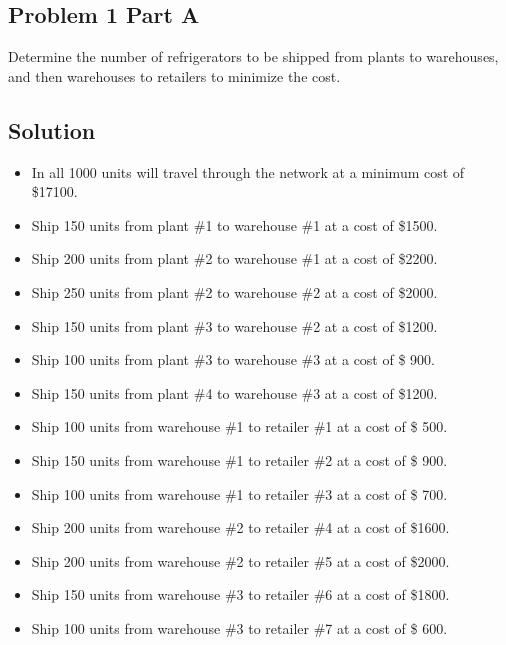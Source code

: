 \documentclass[../report/main.tex]{subfiles}
\begin{document}
\subsection*{Problem 1 Part A}
Determine the number of refrigerators to be shipped from plants to warehouses, and then warehouses to retailers to minimize the cost.

\subsection*{Solution}
\begin{itemize}
	\item In all 1000 units will travel through the network at a minimum cost of \$17100.
	\newline
	\item Ship 150 units from plant \#1 to warehouse \#1 at a cost of \$1500.
	\item Ship 200 units from plant \#2 to warehouse \#1 at a cost of \$2200.
	\item Ship 250 units from plant \#2 to warehouse \#2 at a cost of \$2000.
	\item Ship 150 units from plant \#3 to warehouse \#2 at a cost of \$1200.
	\item Ship 100 units from plant \#3 to warehouse \#3 at a cost of \$ 900.
	\item Ship 150 units from plant \#4 to warehouse \#3 at a cost of \$1200.
	\newline
	\item Ship 100 units from warehouse \#1 to retailer \#1 at a cost of \$ 500.
	\item Ship 150 units from warehouse \#1 to retailer \#2 at a cost of \$ 900.
	\item Ship 100 units from warehouse \#1 to retailer \#3 at a cost of \$ 700.
	\item Ship 200 units from warehouse \#2 to retailer \#4 at a cost of \$1600.
	\item Ship 200 units from warehouse \#2 to retailer \#5 at a cost of \$2000.
	\item Ship 150 units from warehouse \#3 to retailer \#6 at a cost of \$1800.
	\item Ship 100 units from warehouse \#3 to retailer \#7 at a cost of \$ 600.
	\newline

\end{itemize}
\end{document}
